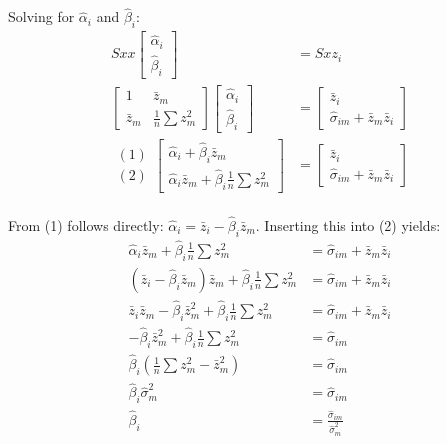 \documentclass[]{article}
\begin{document}
Solving for $\hat{\alpha}_i$ and $\hat{\beta}_i$:
\begin{align*}
	Sxx \left[\begin{array}{c}
		\hat{\alpha}_i \\
		\hat{\beta}_i
	\end{array}\right] & = Sxz_i\\
	\left[\begin{array}{cc}
		1 & \bar{z}_m \\
		\bar{z}_m & \frac{1}{n}\sum{z_m^2}
	\end{array}\right] \left[\begin{array}{c}
		\hat{\alpha}_i \\
		\hat{\beta}_i
	\end{array}\right] &= \left[\begin{array}{c}
		\bar{z}_i \\
		\hat{\sigma}_{im} + \bar{z}_m \bar{z}_i 
	\end{array}\right] \\	
	\begin{array}{c}
		(1) \\
		(2)
	\end{array}
	\left[\begin{array}{c}
		\hat{\alpha}_i + \hat{\beta}_i \bar{z}_m \\
		\hat{\alpha}_i \bar{z}_m + \hat{\beta}_i \frac{1}{n}\sum{z_m^2}
	\end{array}\right] &= \left[\begin{array}{c}
		\bar{z}_i \\
		\hat{\sigma}_{im} + \bar{z}_m \bar{z}_i 
	\end{array}\right] \\
\end{align*}

From (1) follows directly: $\hat{\alpha}_i = \bar{z}_i - \hat{\beta}_i \bar{z}_m$. Inserting this into (2) yields:
\begin{align*}
	\hat{\alpha}_i \bar{z}_m + \hat{\beta}_i \frac{1}{n}\sum{z_m^2} &= \hat{\sigma}_{im} + \bar{z}_m \bar{z}_i \\
	(\bar{z}_i - \hat{\beta}_i \bar{z}_m)\bar{z}_m + \hat{\beta}_i \frac{1}{n}\sum{z_m^2} &= \hat{\sigma}_{im} + \bar{z}_m \bar{z}_i \\
	\bar{z}_i \bar{z}_m - \hat{\beta}_i \bar{z}_m^2 + \hat{\beta}_i \frac{1}{n}\sum{z_m^2} &= \hat{\sigma}_{im} + \bar{z}_m \bar{z}_i \\
	- \hat{\beta}_i \bar{z}_m^2 + \hat{\beta}_i \frac{1}{n}\sum{z_m^2} &= \hat{\sigma}_{im}\\
	\hat{\beta}_i  (\frac{1}{n}\sum{z_m^2}-\bar{z}_m^2) &= \hat{\sigma}_{im}\\
	\hat{\beta}_i \hat{\sigma}_{m}^2 &= \hat{\sigma}_{im}\\
	\hat{\beta}_i &=  \frac{\hat{\sigma}_{im}}{\hat{\sigma}_{m}^2}\\
\end{align*}
\end{document}
